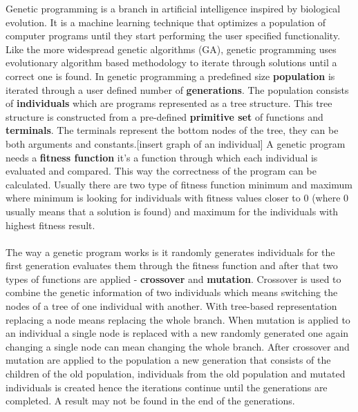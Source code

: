 Genetic programming is a branch in artificial intelligence inspired by biological evolution. It is a machine learning
technique that optimizes a population of computer programs until they start performing the user specified
functionality. Like the more widespread genetic algorithms (GA), genetic programming uses evolutionary algorithm
based methodology to iterate through solutions until a correct one is found. In genetic programming a 
predefined size \textbf{population} is iterated through a user defined number of \textbf{generations}. 
The population consists of \textbf{individuals} which are programs represented as a tree structure.
This tree structure is constructed from a pre-defined \textbf{primitive set} of functions and \textbf{terminals}.
The terminals represent the bottom nodes of the tree, they can be both arguments and constants.[insert graph of an individual]
A genetic program needs a \textbf{fitness function} it's a function through which each individual
is evaluated and compared. This way the correctness of the program can be calculated. Usually there are two type of fitness function 
minimum and maximum where minimum is looking for individuals with fitness values closer to 0 (where 0 usually means that a solution is found)
and maximum for the individuals with highest fitness result. 
\paragraph{}
The way a genetic program works is it randomly generates individuals for the first generation evaluates them through the 
fitness function and after that two types of functions are applied - \textbf{crossover} and \textbf{mutation}. Crossover 
is used to combine the genetic information of two individuals which means switching the nodes of a tree of one individual
with another. With tree-based representation replacing a node means replacing the whole branch. When mutation
is applied to an individual a single node is replaced with a new randomly generated one again changing a single
node can mean changing the whole branch. After crossover and mutation are applied to the population a new generation
that consists of the children of the old population, individuals from the old population and mutated individuals is created
hence the iterations continue until the generations are completed. A result may not be found in the end of the generations.
